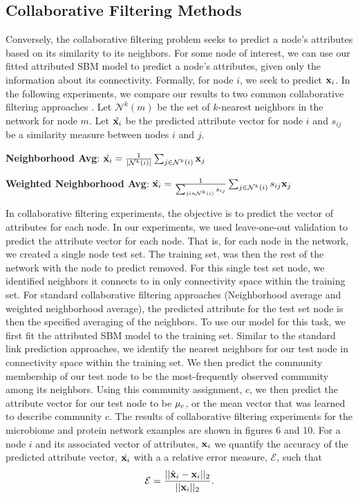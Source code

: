 \subsection{Collaborative Filtering Methods}
Conversely, the collaborative filtering problem seeks to predict a node's attributes based on its similarity to its neighbors. For some node of interest, we can use our fitted attributed SBM model to predict a node's attributes, given only the information about its connectivity. Formally, for node $i$, we seek to predict ${\bf x}_{i}$. In the following experiments, we compare our results to two common collaborative filtering approaches \cite{collabFilterReview}. Let $\mathcal{N}^{k}(m)$ be the set of $k$-nearest neighbors in the network for node $m$. Let $\hat{{\bf x}_{i}}$ be the predicted attribute vector for node $i$ and $s_{ij}$ be a similarity measure between nodes $i$ and $j$. 

{\bf Neighborhood Avg}: $\hat{{\bf x}_{i}}= \frac{1}{|\mathcal{N}^{k}(i)|}\sum_{j \in \mathcal{N}^{k}(i)} {\bf x}_{j}$

{\bf Weighted Neighborhood Avg}: $\hat{{\bf x}_{i}}=\frac{1}{\sum_{j in \mathcal{N}^{k}(i)}s_{ij}}\sum_{j \in \mathcal{N}^{k}(i)}s_{ij}{\bf x}_{j}$

In collaborative filtering experiments, the objective is to predict the vector of attributes for each node. In our experiments, we used leave-one-out validation to predict the attribute vector for each node. That is, for each node in the network, we created a single node test set. The training set, was then the rest of the network with the node to predict removed. For this single test set node, we identified neighbors it connects to in only connectivity space within the training set. For standard collaborative filtering approaches (Neighborhood average and weighted neighborhood average), the predicted attribute for the test set node is then the specified averaging of the neighbors. To use our model for this task, we first fit the attributed SBM model to the training set. Similar to the standard link prediction approaches, we identify the nearest neighbors for our test node in connectivity space within the training set. We then predict the community membership of our test node to be the most-frequently observed community among its neighbors. Using this community assignment, $c$, we then predict the attribute vector for our test node to be ${\bf \mu}_{c}$, or the mean vector that was learned to describe community $c$. The results of collaborative filtering experiments for the microbiome and protein network examples are shown in figures 6 and 10. For a node $i$ and its associated vector of attributes, ${\bf x}_{i}$ we quantify the accuracy of the predicted attribute vector, $\hat{{\bf x}_{i}}$ with a a relative error measure, $\mathcal{E}$, such that 
\begin{equation}
\mathcal{E}=\frac{||\hat{\bf{x}}_{i}-{\bf x}_{i}||_{2}}{||{\bf x}_{i}||_{2}}.
\end{equation}


